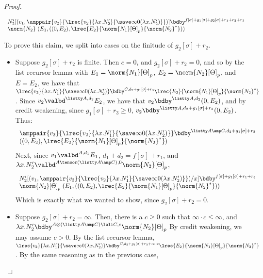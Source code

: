 \begin{proof}
\begin{itemize}
$$
\begin{array}{l}
N_2'[(v_1,\amppair {v_2} {\lrec {v_2} {\lambda x.N_2'} {\save \infty 0 {(\lambda x.N_2')}}})] \bdby^{f[\sigma] + g_1[\sigma] + g_2[\sigma] + r_1 + r_2 + r_3}\\ \norm{N_2} \; (E_1,((0,E_2),\lrec {E_2} {\norm{N_1}[\Theta]_p} {\norm{N_2}^*}))
\end{array}
$$

To prove this claim, we split into cases on the finitude of $g_2[\sigma] + r_2$.
\begin{itemize}
  \item Suppose $g_2[\sigma] + r_2$ is finite. Then $c = 0$, and $g_2[\sigma] + r_2 = 0$, and so by the list recursor lemma with $E_1 = \norm{N_1}[\Theta]_p$, $E_2 = \norm{N_2}[\Theta]_p$, and $E = E_2$, we have that $\lrec {v_2} {\lambda x.N_1'} {\save \infty 0 {(\lambda x.N_2')}} \bdby^{C,d_2 + g_1[\sigma] + r_3} \lrec {E_2} {\norm{N_1}[\Theta]_p} {\norm{N_2}^*}$. Since $v_2 \valbd^{\listty A,d_2} E_2$, we have that $v_2 \bdby^{\listty A,d_2} (0,E_2)$, and by credit weakening, since $g_1[\sigma] + r_3 \geq 0$, $v_2 \bdby^{\listty A,d_2 + g_1[\sigma] + r_3} (0,E_2)$. Thus:
   $$
   \begin{array}{l}
   \amppair {v_2} {\lrec {v_2} {\lambda x.N_1'} {\save \infty 0 {(\lambda x.N_2')}}} \bdby^{\listty A \amp C,d_2 + g_1[\sigma] + r_3}\\ ((0,E_2),\lrec {E_2} {\norm{N_1}[\Theta]_p} {\norm{N_2}^*})   
   \end{array}
   $$
    Next, since $v_1 \valbd^{A,d_1} E_1$, $d_1 + d_2 = f[\sigma] + r_1$, and $\lambda x.N_2' \valbd^{A \tensor (\listty A \amp C),0} \norm{N_2}[\Theta]_p$,
  $$
   \begin{array}{l}
    N_2'[(v_1,\amppair {v_2} {\lrec {v_2} {\lambda x.N_1'} {\save \infty 0 {(\lambda x.N_2')}}})/x] \bdby^{f[\sigma] + g_1[\sigma] + r_1 + r_3} \\\norm{N_2}[\Theta]_p \; (E_1,((0,E_2),\lrec {E_2} {\norm{N_1}[\Theta]_p} {\norm{N_2}^*}))     
   \end{array}
  $$
  Which is exactly what we wanted to show, since $g_2[\sigma] + r_2 = 0$.
  \item Suppose $g_2[\sigma] + r_2 = \infty$. Then, there is a $c \geq 0$ such that $\infty \cdot c \leq \infty$, and $\lambda x.N_2' \bdby^{A \otimes (\listty A \amp C) \loli C,c} \norm{N_2}[\Theta]_p$ By credit weakening, we may assume $c > 0$. By the list recursor lemma, $\lrec {v_2} {\lambda x.N_1'} {\save \infty 0 {(\lambda x.N_2')}} \bdby^{C,d_2 + g_1[\sigma] + r_3 + \infty \cdot c} \lrec {E_2} {\norm{N_1}[\Theta]_p} {\norm{N_2}^*}$. By the same reasoning as in the previous case, 

\end{itemize}
\end{itemize}
\end{proof}
